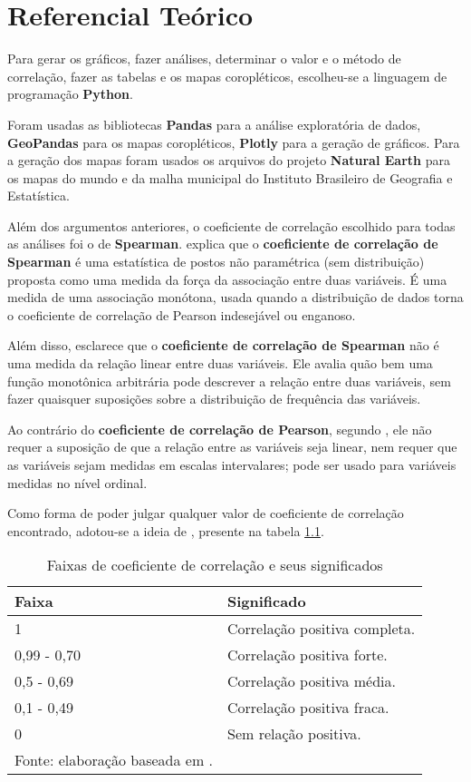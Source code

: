 \chapter{Referencial Teórico}

Para gerar os gráficos, fazer análises, determinar o valor e o método de correlação, fazer as tabelas e os mapas coropléticos, escolheu-se a linguagem de programação \textbf{Python}.

Foram usadas as bibliotecas \textbf{Pandas} para a análise exploratória de dados, \textbf{GeoPandas} para os mapas coropléticos, \textbf{Plotly} para a geração  de gráficos. Para a geração dos mapas foram usados os arquivos do projeto \textbf{Natural Earth} para os mapas do mundo e da malha municipal do Instituto Brasileiro de Geografia e Estatística.

Além dos argumentos anteriores, o coeficiente de correlação escolhido para todas as análises foi o de \textbf{Spearman}. \cite{hauke2011comparison} explica que o \textbf{coeficiente de correlação de Spearman} é uma estatística de postos não paramétrica (sem distribuição) proposta como uma medida da força da associação entre duas variáveis. É uma medida de uma associação monótona, usada quando a distribuição de dados torna o coeficiente de correlação de Pearson indesejável ou enganoso. 

Além disso, \cite{hauke2011comparison} esclarece que o \textbf{coeficiente de correlação de Spearman} não é uma medida da relação linear entre duas variáveis. Ele avalia quão bem uma função monotônica arbitrária pode descrever a relação entre duas variáveis, sem fazer quaisquer suposições sobre a distribuição de frequência das variáveis.

Ao contrário do \textbf{coeficiente de correlação de Pearson}, segundo \cite{hauke2011comparison}, ele não requer a suposição de que a relação entre as variáveis seja linear, nem requer que as variáveis sejam medidas em escalas intervalares; pode ser usado para variáveis medidas no nível ordinal.

Como forma de poder julgar qualquer valor de coeficiente de correlação encontrado, adotou-se a ideia de \cite{ali2022spearman}, presente na tabela \ref{tab:faixas-coeficiente-correlacao}.

\begin{longtable}[c]{@{}ll@{}}
	\caption{Faixas de coeficiente de correlação e seus significados}
	\label{tab:faixas-coeficiente-correlacao}\\
	\toprule
	\endfirsthead
	\toprule
	\endhead
	\textbf{Faixa} & \textbf{Significado} \\ \midrule
	1           & Correlação positiva completa. \\ \midrule
	0,99 - 0,70 & Correlação positiva forte.    \\ \midrule
	0,5 - 0,69  & Correlação positiva média.    \\ \midrule
	0,1 - 0,49  & Correlação positiva fraca.    \\ \midrule
	0           & Sem relação positiva.         \\ \bottomrule
	\footnotesize{Fonte: elaboração baseada em \cite{ali2022spearman}.}
\end{longtable}

